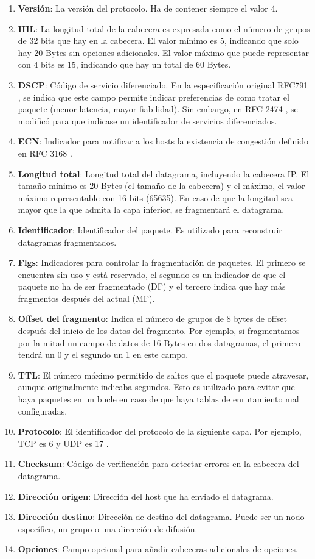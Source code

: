 \begin{enumerate}
    \item \textbf{Versión}: La versión del protocolo. Ha de contener siempre el valor 4.
    \item \textbf{IHL}: La longitud total de la cabecera es expresada como el número de grupos de 32 bits que hay en la cabecera. El valor mínimo es 5, indicando que solo hay 20 Bytes sin opciones adicionales. El valor máximo que puede representar con 4 bits es 15, indicando que hay un total de 60 Bytes.
    \item \textbf{DSCP}: Código de servicio diferenciado. En la especificación original RFC791 \cite{rfc791}, se indica que este campo permite indicar preferencias de como tratar el paquete (menor latencia, mayor fiabilidad). Sin embargo, en RFC 2474 \cite{rfc2474}, se modificó para que indicase un identificador de servicios diferenciados.
    \item \textbf{ECN}: Indicador para notificar a los hosts la existencia de congestión definido en RFC 3168 \cite{rfc3168}.
    \item \textbf{Longitud total}: Longitud total del datagrama, incluyendo la cabecera IP. El tamaño mínimo es 20 Bytes (el tamaño de la cabecera) y el máximo, el valor máximo representable con 16 bits (65635). En caso de que la longitud sea mayor que la que admita la capa inferior, se fragmentará el datagrama.
    \item \textbf{Identificador}: Identificador del paquete. Es utilizado para reconstruir datagramas fragmentados.
    \item \textbf{Flgs}: Indicadores para controlar la fragmentación de paquetes. El primero se encuentra sin uso y está reservado, el segundo es un indicador de que el paquete no ha de ser fragmentado (DF) y el tercero indica que hay más fragmentos después del actual (MF).
    \item \textbf{Offset del fragmento}: Indica el número de grupos de 8 bytes de offset después del inicio de los datos del fragmento. Por ejemplo, si fragmentamos por la mitad un campo de datos de 16 Bytes en dos datagramas, el primero tendrá un 0 y el segundo un 1 en este campo.
    \item \textbf{TTL}: El número máximo permitido de saltos que el paquete puede atravesar, aunque originalmente indicaba segundos. Esto es utilizado para evitar que haya paquetes en un bucle en caso de que haya tablas de enrutamiento mal configuradas.
    \item \textbf{Protocolo}: El identificador del protocolo de la siguiente capa. Por ejemplo, TCP es 6 y UDP es 17 \cite{ipprotocolnumbers}.
    \item \textbf{Checksum}: Código de verificación para detectar errores en la cabecera del datagrama.
    \item \textbf{Dirección origen}: Dirección del host que ha enviado el datagrama.
    \item \textbf{Dirección destino}: Dirección de destino del datagrama. Puede ser un nodo específico, un grupo o una dirección de difusión.
    \item \textbf{Opciones}: Campo opcional para añadir cabeceras adicionales de opciones.
\end{enumerate}

